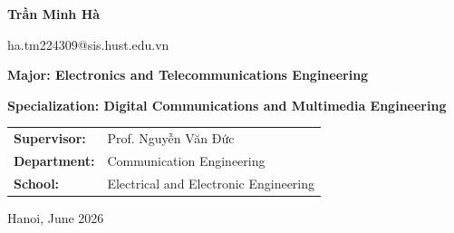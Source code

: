 \begin{titlepage}
\begin{center}
\vspace{1.10cm}

{\bfseries\fontsize{15pt}{19pt}\selectfont
Trần Minh Hà}

\vspace{0.06cm}

{\fontsize{13pt}{16pt}\selectfont
ha.tm224309@sis.hust.edu.vn}

\vspace{0.24cm}

{\bfseries\fontsize{13pt}{16pt}\selectfont
Major: Electronics and Telecommunications Engineering}

\vspace{0.06cm}

{\bfseries\fontsize{13pt}{16pt}\selectfont
Specialization: Digital Communications and Multimedia Engineering}

\vspace{1.10cm}

\begin{minipage}{0.78\textwidth}
\centering
\fontsize{13pt}{18pt}\selectfont
\begin{tabular}{@{}p{3.4cm}p{8.0cm}@{}}
\textbf{Supervisor:}  & Prof. Nguyễn Văn Đức \\[0.22cm]
\textbf{Department:}  & Communication Engineering \\[0.22cm]
\textbf{School:}      & Electrical and Electronic Engineering
\end{tabular}
\end{minipage}

\vfill

{\fontsize{13pt}{16pt}\selectfont
Hanoi, June 2026}

\end{center}

\end{titlepage}
\cleardoublepage
